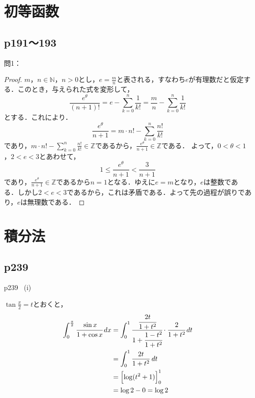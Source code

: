 \documentclass[dvipdfmx,uplatex,11pt]{jsarticle}
\theoremstyle{definition}
\begin{document}
\newpage

\section{初等函数}
\subsection{p191〜193}
%
問1：
\begin{leftbar}
    \begin{proof}
        $m，n \in \mathbb{N}$，$n >0$とし，$e=\frac{m}{n}$と表される，すなわち$e$が有理数だと仮定する．このとき，与えられた式を変形して，
        \[
            \frac{e^\theta}{(n+1)!} = e-\sum_{k=0}^{n} \frac{1}{k!} =\frac{m}{n}-\sum_{k=0}^{n} \frac{1}{k!}
        \]
        とする．これにより．
        \[
            \frac{e^{\theta}}{n+1} = m \cdot n! - \sum_{k=0}^{n} \frac{n!}{k!}
        \]
        であり，$m \cdot n! - \sum_{k=0}^{n} \frac{n!}{k!} \in \mathbb{Z}$であるから，$\frac{e^{\theta}}{n+1} \in \mathbb{Z}$である．
        よって，$0< \theta <1$，$2<e<3$とあわせて，
        \[
            1 \le \frac{e^{\theta}}{n+1} < \frac{3}{n+1}
        \]
        であり，$\frac{e^{\theta}}{n+1} \in \mathbb{Z}$であるから$n=1$となる．ゆえに$e=m$となり，$e$は整数である．しかし$2<e<3$であるから，これは矛盾である．よって先の過程が誤りであり，$e$は無理数である．
    \end{proof}
\end{leftbar}
\newpage

\section{積分法}


\subsection{p239}

\begin{screen}
	p239 \, (i) \par 
	 $\tan \frac{x}{2}=t$とおくと，
	\begin{align*}
		\int_{0}^{\frac{\pi}{2}} \cfrac{\sin x}{1+\cos x} \, dx & = \int_{0}^{1} \cfrac{\cfrac{2t}{1+t^2}}{1+\cfrac{1-t^2}{1+t^2}} \cdot \cfrac{2}{1+t^2} \, dt \\
		& = \int_{0}^{1} \frac{2t}{1+t^2} \, dt \\
		& = \Bigl[\log (t^2+1)\Bigl]_{0}^{1} \\
		& = \log 2-0 = \log 2
	\end{align*}
\end{screen}
\end{document}
